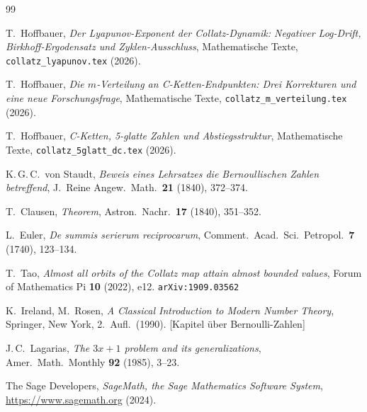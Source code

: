 \documentclass[12pt,a4paper]{article}
\begin{document}
\begin{thebibliography}{99}

T.\ Hoffbauer,
\textit{Der Lyapunov-Exponent der Collatz-Dynamik: Negativer Log-Drift, Birkhoff-Ergodensatz
und Zyklen-Ausschluss},
Mathematische Texte, \texttt{collatz\_lyapunov.tex} (2026).

T.\ Hoffbauer,
\textit{Die $m$-Verteilung an C-Ketten-Endpunkten: Drei Korrekturen und eine neue Forschungsfrage},
Mathematische Texte, \texttt{collatz\_m\_verteilung.tex} (2026).

T.\ Hoffbauer,
\textit{C-Ketten, 5-glatte Zahlen und Abstiegsstruktur},
Mathematische Texte, \texttt{collatz\_5glatt\_dc.tex} (2026).

K.\,G.\,C.\ von Staudt,
\textit{Beweis eines Lehrsatzes die Bernoullischen Zahlen betreffend},
J.\ Reine Angew.\ Math.\ \textbf{21} (1840), 372--374.

T.\ Clausen,
\textit{Theorem},
Astron.\ Nachr.\ \textbf{17} (1840), 351--352.

L.\ Euler,
\textit{De summis serierum reciprocarum},
Comment.\ Acad.\ Sci.\ Petropol.\ \textbf{7} (1740), 123--134.

T.\ Tao,
\textit{Almost all orbits of the Collatz map attain almost bounded values},
Forum of Mathematics Pi \textbf{10} (2022), e12.
\texttt{arXiv:1909.03562}

K.\ Ireland, M.\ Rosen,
\textit{A Classical Introduction to Modern Number Theory},
Springer, New York, 2.\ Aufl.\ (1990). [Kapitel über Bernoulli-Zahlen]

J.\,C.\ Lagarias,
\textit{The $3x+1$ problem and its generalizations},
Amer.\ Math.\ Monthly \textbf{92} (1985), 3--23.

The Sage Developers,
\textit{SageMath, the Sage Mathematics Software System},
\url{https://www.sagemath.org} (2024).

\end{thebibliography}
\end{document}

